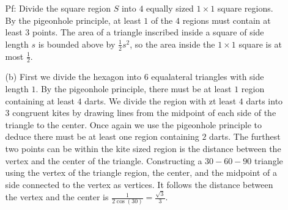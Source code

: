 \documentclass[10pt]{article}
\begin{document}
\begin{enumerate}[label= (Q-\arabic*)]
\begin{itemize}
        Pf: Divide the square region $S$ into $4$ equally sized $1\times1$ square regions.
        By the pigeonhole principle, at least $1$ of the $4$ regions must contain at least $3$ points. 
        The area of a triangle inscribed inside a square of side length $s$ is bounded above by $\frac{1}{2}s^2$, so the area inside the $1\times1$ square is at most $\frac{1}{2}$.
        \item [(b)] First we divide the hexagon into $6$ equalateral triangles with side length $1$. 
        By the pigeonhole principle, there must be at least $1$ region containing at least $4$ darts.
        We divide the region with zt least $4$ darts into $3$ congruent kites by drawing lines from the midpoint of each side of the triangle to the center.
        Once again we use the pigeonhole principle to deduce there must be at least one region containing $2$ darts.
        The furthest two points can be within the kite sized region is the distance between the vertex and the center of the triangle.
        Constructing a $30-60-90$ triangle using the vertex of the triangle region, the center, and the midpoint of a side connected to the vertex as vertices. 
        It follows the distance between the vertex and the center is $\frac{1}{2\cos(30)}=\frac{\sqrt{3}}{3}$.


\end{itemize}
\end{enumerate}
\end{document}

